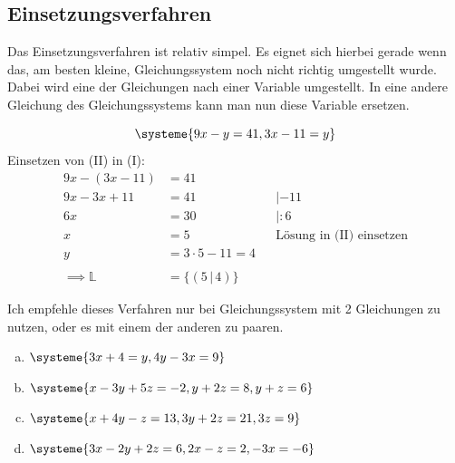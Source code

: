 \documentclass[a4paper,12pt]{article}
\newcommand{\Aufgabe}[2]{
	{
		\vspace*{0.3cm}
		\begin{tcolorbox}[breakable,colback=yellow!0,colframe=black!65!white,title=\textbf{Aufgabe #1:},width=\linewidth ]
			{#2}
		\end{tcolorbox}
		
		
	}
}
\newcommand{\Beispiel}[1]{
	\vspace*{0.2cm}
	\begin{tcolorbox}[breakable,colback=yellow!0,colframe=green!65!black,title=\textbf{Beispiel:},width=\linewidth ]
		{#1}
	\end{tcolorbox}
}
\begin{document}
	\subsection{Einsetzungsverfahren}
	Das Einsetzungsverfahren ist relativ simpel. Es eignet sich hierbei gerade wenn das, am besten kleine, Gleichungssystem noch nicht richtig umgestellt wurde. \\
	Dabei wird eine der Gleichungen nach einer Variable umgestellt. In eine andere Gleichung des Gleichungssystems kann man nun diese Variable ersetzen.
	\Beispiel{\[\systeme{
			9x-y=41,
			3x-11=y
		}\]
		Einsetzen von (II) in (I):
		\begin{align*}
			9x- (3x-11)&=41&&\\
			9x- 3x+11&=41&&|-11\\
			6x&=30&&|:6\\
			x&=5&&\text{Lösung in (II) einsetzen}\\
			y&=3\cdot 5 - 11 =4\\\\
			\implies \mathds{L}&=\{(5\,|\,4)\}
		\end{align*}
	}
	Ich empfehle dieses Verfahren nur bei Gleichungssystem mit 2 Gleichungen zu nutzen, oder es mit einem der anderen zu paaren.
	\Aufgabe{2.2.1: (Finde die Lösungsmenge mittels Einsetzungsverfahren)}{
		\begin{multicols}{2}
			\begin{enumerate}[(a)]
				\item $\systeme{3x+4=y,
					4y-3x=9}$
				\item $\systeme{x - 3y + 5z = -2,
					y + 2z = 8,
					y + z =6}$
				\item $\systeme{x + 4y - z = 13,
					3y + 2z = 21,
					3z = 9}$
				\item $\systeme{3x - 2y + 2z = 6,
					2x - z = 2,
					-3x = -6}$
			\end{enumerate}
		\end{multicols}
	}
\end{document}
